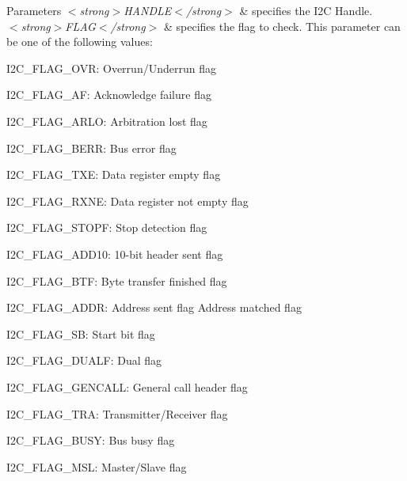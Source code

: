 \begin{DoxyParams}{Parameters}
{\em $<$strong$>$\-H\-A\-N\-D\-L\-E$<$/strong$>$} & specifies the I2\-C Handle. \\
\hline
{\em $<$strong$>$\-F\-L\-A\-G$<$/strong$>$} & specifies the flag to check. This parameter can be one of the following values\-: \begin{DoxyItemize}
\item I2\-C\-\_\-\-F\-L\-A\-G\-\_\-\-O\-V\-R\-: Overrun/\-Underrun flag \item I2\-C\-\_\-\-F\-L\-A\-G\-\_\-\-A\-F\-: Acknowledge failure flag \item I2\-C\-\_\-\-F\-L\-A\-G\-\_\-\-A\-R\-L\-O\-: Arbitration lost flag \item I2\-C\-\_\-\-F\-L\-A\-G\-\_\-\-B\-E\-R\-R\-: Bus error flag \item I2\-C\-\_\-\-F\-L\-A\-G\-\_\-\-T\-X\-E\-: Data register empty flag \item I2\-C\-\_\-\-F\-L\-A\-G\-\_\-\-R\-X\-N\-E\-: Data register not empty flag \item I2\-C\-\_\-\-F\-L\-A\-G\-\_\-\-S\-T\-O\-P\-F\-: Stop detection flag \item I2\-C\-\_\-\-F\-L\-A\-G\-\_\-\-A\-D\-D10\-: 10-\/bit header sent flag \item I2\-C\-\_\-\-F\-L\-A\-G\-\_\-\-B\-T\-F\-: Byte transfer finished flag \item I2\-C\-\_\-\-F\-L\-A\-G\-\_\-\-A\-D\-D\-R\-: Address sent flag Address matched flag \item I2\-C\-\_\-\-F\-L\-A\-G\-\_\-\-S\-B\-: Start bit flag \item I2\-C\-\_\-\-F\-L\-A\-G\-\_\-\-D\-U\-A\-L\-F\-: Dual flag \item I2\-C\-\_\-\-F\-L\-A\-G\-\_\-\-G\-E\-N\-C\-A\-L\-L\-: General call header flag \item I2\-C\-\_\-\-F\-L\-A\-G\-\_\-\-T\-R\-A\-: Transmitter/\-Receiver flag \item I2\-C\-\_\-\-F\-L\-A\-G\-\_\-\-B\-U\-S\-Y\-: Bus busy flag \item I2\-C\-\_\-\-F\-L\-A\-G\-\_\-\-M\-S\-L\-: Master/\-Slave flag \end{DoxyItemize}
\\
\hline
\end{DoxyParams}

